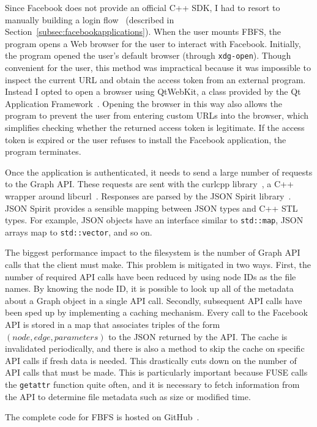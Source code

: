 \documentclass[11pt,twocolumn]{article}
\begin{document}
Since Facebook does not provide an official C++ SDK, I had to resort to
manually building a login flow~\cite{fblogin14} (described in
Section~\ref{subsec:facebookapplications}). When the user mounts FBFS, the
program opens a Web browser for the user to interact with Facebook. Initially,
the program opened the user's default browser (through \texttt{xdg-open}).
Though convenient for the user, this method was impractical because it was
impossible to inspect the current URL and obtain the access token from an
external program. Instead I opted to open a browser using QtWebKit, a class
provided by the Qt Application Framework~\cite{qtproject}. Opening the browser
in this way also allows the program to prevent the user from entering custom
URLs into the browser, which simplifies checking whether the returned access
token is legitimate. If the access token is expired or the user refuses to
install the Facebook application, the program terminates.

Once the application is authenticated, it needs to send a large number of
requests to the Graph API\@. These requests are sent with the
curlcpp library~\cite{curlcpp}, a C++ wrapper around libcurl~\cite{libcurl}.
Responses are parsed by the JSON Spirit library~\cite{jsonspirit}. JSON Spirit
provides a sensible mapping between JSON types and C++ STL types. For example,
JSON objects have an interface similar to \texttt{std::map}, JSON arrays map to
\texttt{std::vector}, and so on.

The biggest performance impact to the filesystem is the number of Graph API
calls that the client must make. This problem is mitigated in two ways. First,
the number of required API calls have been reduced by using node IDs as the
file names. By knowing the node ID, it is possible to look up all of the
metadata about a Graph object in a single API call. Secondly, subsequent API
calls have been sped up by implementing a caching mechanism. Every call to the
Facebook API is stored in a map that associates triples of the form
$(\mathit{node}, \mathit{edge}, \mathit{parameters})$ to the JSON returned by
the API\@. The cache is invalidated periodically, and there is also a method to
skip the cache on specific API calls if fresh data is needed. This drastically
cuts down on the number of API calls that must be made. This is particularly
important because FUSE calls the \texttt{getattr} function quite often, and
it is necessary to fetch information from the API to determine file metadata
such as size or modified time.

The complete code for FBFS is hosted on GitHub~\cite{fbfsgit}.
\end{document}
